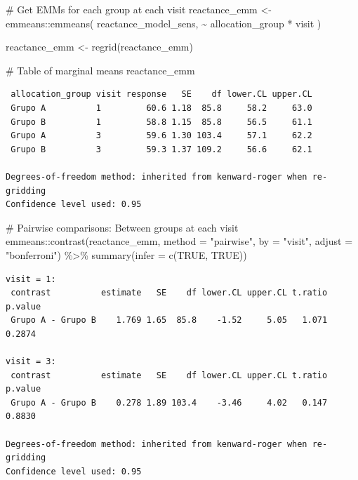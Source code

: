 \documentclass[
  letterpaper,
  DIV=11,
  numbers=noendperiod]{scrartcl}
\newenvironment{Shaded}{\begin{snugshade}}{\end{snugshade}}
\newcommand{\AttributeTok}[1]{\textcolor[rgb]{0.40,0.45,0.13}{#1}}
\newcommand{\CommentTok}[1]{\textcolor[rgb]{0.37,0.37,0.37}{#1}}
\newcommand{\ConstantTok}[1]{\textcolor[rgb]{0.56,0.35,0.01}{#1}}
\newcommand{\FunctionTok}[1]{\textcolor[rgb]{0.28,0.35,0.67}{#1}}
\newcommand{\NormalTok}[1]{\textcolor[rgb]{0.00,0.23,0.31}{#1}}
\newcommand{\OtherTok}[1]{\textcolor[rgb]{0.00,0.23,0.31}{#1}}
\newcommand{\SpecialCharTok}[1]{\textcolor[rgb]{0.37,0.37,0.37}{#1}}
\newcommand{\StringTok}[1]{\textcolor[rgb]{0.13,0.47,0.30}{#1}}
\begin{document}
\begin{Shaded}
\begin{Highlighting}[]
\CommentTok{\# Get EMMs for each group at each visit}
\NormalTok{reactance\_emm }\OtherTok{\textless{}{-}}\NormalTok{ emmeans}\SpecialCharTok{::}\FunctionTok{emmeans}\NormalTok{(}
\NormalTok{    reactance\_model\_sens, }
    \SpecialCharTok{\textasciitilde{}}\NormalTok{ allocation\_group }\SpecialCharTok{*}\NormalTok{ visit}
\NormalTok{)}

\NormalTok{reactance\_emm }\OtherTok{\textless{}{-}} \FunctionTok{regrid}\NormalTok{(reactance\_emm)}

\CommentTok{\# Table of marginal means}
\NormalTok{reactance\_emm}
\end{Highlighting}
\end{Shaded}

\begin{verbatim}
 allocation_group visit response   SE    df lower.CL upper.CL
 Grupo A          1         60.6 1.18  85.8     58.2     63.0
 Grupo B          1         58.8 1.15  85.8     56.5     61.1
 Grupo A          3         59.6 1.30 103.4     57.1     62.2
 Grupo B          3         59.3 1.37 109.2     56.6     62.1

Degrees-of-freedom method: inherited from kenward-roger when re-gridding 
Confidence level used: 0.95 
\end{verbatim}

\begin{Shaded}
\begin{Highlighting}[]
\CommentTok{\# Pairwise comparisons: Between groups at each visit}
\NormalTok{emmeans}\SpecialCharTok{::}\FunctionTok{contrast}\NormalTok{(reactance\_emm, }\AttributeTok{method =} \StringTok{"pairwise"}\NormalTok{, }\AttributeTok{by =} \StringTok{"visit"}\NormalTok{, }\AttributeTok{adjust =} \StringTok{"bonferroni"}\NormalTok{) }\SpecialCharTok{\%\textgreater{}\%} \FunctionTok{summary}\NormalTok{(}\AttributeTok{infer =} \FunctionTok{c}\NormalTok{(}\ConstantTok{TRUE}\NormalTok{, }\ConstantTok{TRUE}\NormalTok{))}
\end{Highlighting}
\end{Shaded}

\begin{verbatim}
visit = 1:
 contrast          estimate   SE    df lower.CL upper.CL t.ratio p.value
 Grupo A - Grupo B    1.769 1.65  85.8    -1.52     5.05   1.071  0.2874

visit = 3:
 contrast          estimate   SE    df lower.CL upper.CL t.ratio p.value
 Grupo A - Grupo B    0.278 1.89 103.4    -3.46     4.02   0.147  0.8830

Degrees-of-freedom method: inherited from kenward-roger when re-gridding 
Confidence level used: 0.95 
\end{verbatim}
\end{document}
